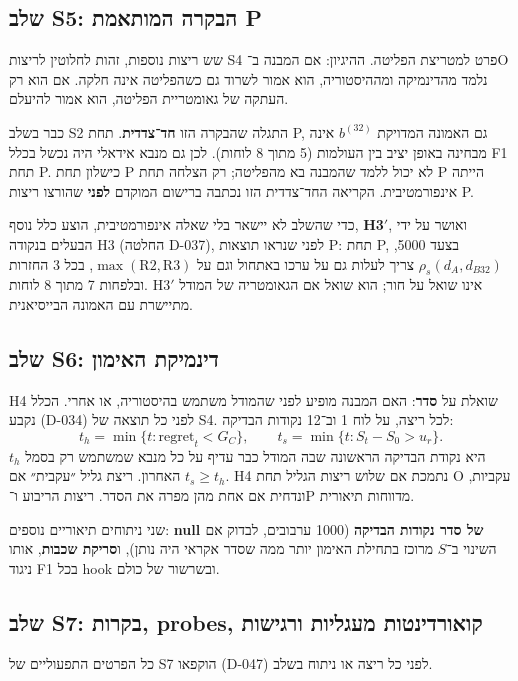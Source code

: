 \documentclass[12pt,a4paper]{article}
\newcommand{\en}[1]{\foreignlanguage{english}{#1}}   %
\newcommand{\bel}[1]{b^{(#1)}}
\newcommand{\GC}{G_{C}}
\begin{document}
\subsection{שלב S5: הבקרה המותאמת P}
שש ריצות נוספות, זהות לחלוטין לריצות S4 פרט למטריצת הפליטה. ההיגיון: אם המבנה ב־O נלמד מהדינמיקה ומההיסטוריה, הוא אמור לשרוד גם כשהפליטה אינה חלקה. אם הוא רק העתקה של גאומטריית הפליטה, הוא אמור להיעלם.

כבר בשלב S2 התגלה שהבקרה הזו \textbf{חד־צדדית}. תחת P, גם האמונה המדויקת $\bel{32}$ אינה מבחינה באופן יציב בין העולמות (5 מתוך 8 לוחות). לכן גם מנבא אידאלי היה נכשל בכלל F1 תחת P. כישלון תחת P לא יכול ללמד שהמבנה בא מהפליטה; רק הצלחה תחת P הייתה אינפורמטיבית. הקריאה החד־צדדית הזו נכתבה ברישום המוקדם \textbf{לפני} שהורצו ריצות P.

כדי שהשלב לא יישאר בלי שאלה אינפורמטיבית, הוצע כלל נוסף, \textbf{H3$'$}, ואושר על ידי הבעלים בנקודה H3 (החלטה \en{D-037}), לפני שנראו תוצאות P: תחת P, בצעד 5000, $\rho_s(d_A,d_{B32})$ צריך לעלות גם על ערכו באתחול וגם על $\max(\mathrm{R2},\mathrm{R3})$, בכל 3 החזרות ובלפחות 7 מתוך 8 לוחות. H3$'$ אינו שואל על חור; הוא שואל אם הגאומטריה של המודל מתיישרת עם האמונה הבייסיאנית.

\subsection{שלב S6: דינמיקת האימון}
H4 שואלת על \textbf{סדר}: האם המבנה מופיע לפני שהמודל משתמש בהיסטוריה, או אחרי. הכלל נקבע (\en{D-034}) לפני כל תוצאה של S4. לכל ריצה, על לוח 1 וב־12 נקודות הבדיקה:
\begin{equation}
t_h=\min\{t:\mathrm{regret}_t<\GC\},\qquad t_s=\min\{t:S_t-S_0>u_r\}.
\end{equation}
$t_h$ היא נקודת הבדיקה הראשונה שבה המודל כבר עדיף על כל מנבא שמשתמש רק בסמל האחרון. ריצת גליל ״עקבית״ אם $t_s\ge t_h$. H4 נתמכת אם שלוש ריצות הגליל תחת O עקביות, ונדחית אם אחת מהן מפרה את הסדר. ריצות הריבוע ו־P מדווחות תיאורית.

שני ניתוחים תיאוריים נוספים: \textbf{\en{null} של סדר נקודות הבדיקה} (1000 ערבובים, לבדוק אם השינוי ב־$S$ מרוכז בתחילת האימון יותר ממה שסדר אקראי היה נותן), ו\textbf{סריקת שכבות}, אותו ניגוד F1 בכל \en{hook} ובשרשור של כולם.

\subsection{שלב S7: בקרות, \en{probes}, קואורדינטות מעגליות ורגישות}
כל הפרטים התפעוליים של S7 הוקפאו (\en{D-047}) לפני כל ריצה או ניתוח בשלב.
\end{document}
